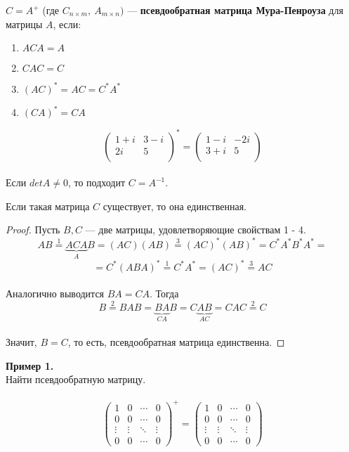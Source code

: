 \begin{definition}
    $C=A^+$ (где $C_{n \times m}, ~A_{m \times n})$ --- \textbf{псевдообратная матрица Мура-Пенроуза} для матрицы $A$, если:
\begin{enumerate}
    \item $ACA=A$
    \item $CAC=C$
    \item $(AC)^*=AC=C^*A^*$
    \item $(CA)^*=CA$
\end{enumerate}
\end{definition}
\[\begin{pmatrix}
1+i & 3-i\\
2i & 5\\
\end{pmatrix}^* = \begin{pmatrix}
1-i & -2i\\
3+i & 5\\
\end{pmatrix}\]
\\ 
Если $detA \neq 0$, то подходит $C=A^{-1}$.
\begin{theorem}
    Если такая матрица $C$ существует, то она единственная.
\end{theorem}
\begin{proof}
    Пусть $B, C$ --- две матрицы, удовлетворяющие свойствам 1 - 4.\\
$$AB\overset{1}{=}\underbrace{ACA}_{A}B=(AC)(AB)\overset{3}{=}(AC)^*(AB)^*=C^*A^*B^*A^*=$$
$$=C^*(ABA)^*\overset{1}{=}C^*A^*=(AC)^*\overset{3}{=}AC$$\\
Аналогично выводится $BA=CA$. Тогда
$$B\overset{2}{=}BAB=\underbrace{BA}_{CA}B=C\underbrace{AB}_{AC}=CAC\overset{2}{=}C$$\\
Значит, $B=C$, то есть, псевдообратная матрица единственна.
\end{proof}
\noindent \textbf{Пример 1.}\\
Найти псевдообратную матрицу.\\ \\
\[\begin{pmatrix}
1 & 0 & \cdots & 0 \\
0 & 0 & \cdots & 0 \\         
\vdots & \vdots & \ddots & \vdots \\
0 & 0 & \cdots & 0
\end{pmatrix}^+ = \begin{pmatrix}
1 & 0 & \cdots & 0 \\
0 & 0 & \cdots & 0 \\         
\vdots & \vdots & \ddots & \vdots \\
0 & 0 & \cdots & 0
\end{pmatrix}\]\\
